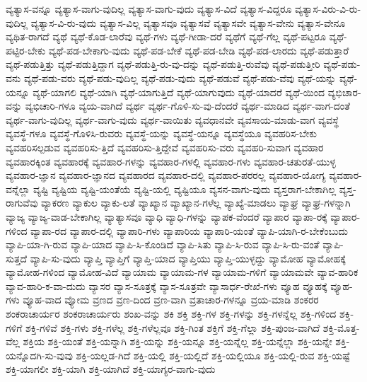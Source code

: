 {ವ್ಯತ್ಯಾಸ-ವನ್ನೂ
ವ್ಯತ್ಯಾಸ-ವಾಗು-ವುದಿಲ್ಲ
ವ್ಯತ್ಯಾಸ-ವಾಗು-ವುದು
ವ್ಯತ್ಯಾಸ-ವಿದೆ
ವ್ಯತ್ಯಾಸ-ವಿದ್ದರೂ
ವ್ಯತ್ಯಾಸ-ವಿರು-ವಿ-ರು-ವುದಿಲ್ಲ
ವ್ಯತ್ಯಾಸ-ವಿ-ರು-ವುದು
ವ್ಯತ್ಯಾಸ-ವಿಲ್ಲ
ವ್ಯತ್ಯಾಸವೂ
ವ್ಯತ್ಯಾಸವೆ
ವ್ಯತ್ಯಾಸವೇ
ವ್ಯತ್ಯಾಸ-ವೇನು
ವ್ಯತ್ಯಾಸ-ವೇನೂ
ವ್ಯಥಿತ-ರಾಗದೆ
ವ್ಯಥೆ
ವ್ಯಥೆ-ಕೊಡ-ಲಾರೆವು
ವ್ಯಥೆ-ಗಳು
ವ್ಯಥೆ-ಗೀಡಾ-ದರೆ
ವ್ಯಥೆಗೆ
ವ್ಯಥೆ-ಗೆಲ್ಲ
ವ್ಯಥೆ-ಪಟ್ಟರೂ
ವ್ಯಥೆ-ಪಟ್ಟಿರ-ಬೇಕು
ವ್ಯಥೆ-ಪಡ-ಬೇಕಾಗು-ವುದು
ವ್ಯಥೆ-ಪಡ-ಬೇಕೆ
ವ್ಯಥೆ-ಪಡ-ಬೇಡಿ
ವ್ಯಥೆ-ಪಡ-ಲಾರದು
ವ್ಯಥೆ-ಪಡುತ್ತಾರೆ
ವ್ಯಥೆ-ಪಡುತ್ತಿತ್ತು
ವ್ಯಥೆ-ಪಡುತ್ತಿದ್ದಾಗ
ವ್ಯಥೆ-ಪಡುತ್ತಿ-ರು-ವು-ದನ್ನು
ವ್ಯಥೆ-ಪಡುತ್ತಿ-ರುವೆವು
ವ್ಯಥೆ-ಪಡುತ್ತೀರಿ
ವ್ಯಥೆ-ಪಡು-ವನು
ವ್ಯಥೆ-ಪಡು-ವರು
ವ್ಯಥೆ-ಪಡು-ವುದಿಲ್ಲ
ವ್ಯಥೆ-ಪಡು-ವುದು
ವ್ಯಥೆ-ಪಡುವೆ
ವ್ಯಥೆ-ಪಡು-ವೆವು
ವ್ಯಥೆ-ಯನ್ನು
ವ್ಯಥೆ-ಯನ್ನೂ
ವ್ಯಥೆ-ಯಾಗಲಿ
ವ್ಯಥೆ-ಯಾಗಿ
ವ್ಯಥೆ-ಯಾಗುತ್ತಿದೆ
ವ್ಯಥೆ-ಯಾಗುವುದು
ವ್ಯಥೆ-ಯಾದರೆ
ವ್ಯಥೆ-ಯಿಂದ
ವ್ಯಭಿಚಾರ-ವನ್ನು
ವ್ಯಭಿಚಾರಿ-ಗಳೂ
ವ್ಯಯ-ವಾಗಿದೆ
ವ್ಯರ್ಥ
ವ್ಯರ್ಥ-ಗೊಳಿ-ಸು-ವು-ದೆಂದರೆ
ವ್ಯರ್ಥ-ಮಾಡಿದ
ವ್ಯರ್ಥ-ವಾಗ-ದಂತೆ
ವ್ಯರ್ಥ-ವಾಗು-ವುದಿಲ್ಲ
ವ್ಯರ್ಥ-ವಾಗು-ವುದು
ವ್ಯರ್ಥ-ವಾಯಿತು
ವ್ಯವಧಾನವೇ
ವ್ಯವಸಾಯ-ಮಾಡು-ವಾಗ
ವ್ಯವಸ್ಥೆ
ವ್ಯವಸ್ಥೆ-ಗಳೂ
ವ್ಯವಸ್ಥೆ-ಗೊಳಿಸಿ-ರುವರು
ವ್ಯವಸ್ಥೆ-ಯನ್ನು
ವ್ಯವಸ್ಥೆ-ಯನ್ನೂ
ವ್ಯವಸ್ಥೆಯೂ
ವ್ಯವಹರಿಸ-ಬೇಕು
ವ್ಯವಹರಿಸಲ್ಪಡುವ
ವ್ಯವಹರಿಸು-ತ್ತಿದೆ
ವ್ಯವಹರಿಸು-ತ್ತಿದ್ದೇವೆ
ವ್ಯವಹರಿಸು-ವರು
ವ್ಯವಹರಿ-ಸುವಾಗ
ವ್ಯವಹಾರ
ವ್ಯವಹಾರಕ್ಕಿಂತ
ವ್ಯವಹಾರಕ್ಕೆ
ವ್ಯವಹಾರ-ಗಳನ್ನು
ವ್ಯವಹಾರ-ಗಳಲ್ಲಿ
ವ್ಯವಹಾರ-ಗಳು
ವ್ಯವಹಾರ-ಚತುರತೆ-ಯುಳ್ಳ
ವ್ಯವಹಾರ-ಜ್ಞಾನ
ವ್ಯವಹಾರ-ಜ್ಞಾನದ
ವ್ಯವಹಾರದ
ವ್ಯವಹಾರ-ದಲ್ಲಿ
ವ್ಯವಹಾರ-ಪರರಲ್ಲ
ವ್ಯವಹಾರ-ಯೋಗ್ಯ
ವ್ಯವಹಾರ-ವನ್ನೆಲ್ಲಾ
ವ್ಯಷ್ಟಿ
ವ್ಯಷ್ಟಿಯ
ವ್ಯಷ್ಟಿ-ಯಂತೆಯೆ
ವ್ಯಷ್ಟಿ-ಯಲ್ಲಿ
ವ್ಯಷ್ಟಿಯೂ
ವ್ಯಸನ-ವಾಗು-ವುದು
ವ್ಯಸ್ತರಾಗ-ಬೇಕಾಗಿಲ್ಲ
ವ್ಯಸ್ತ-ರಾಗುವೆವು
ವ್ಯಾಕರಣ
ವ್ಯಾಕುಲ
ವ್ಯಾಕು-ಲತೆ
ವ್ಯಾಖ್ಯಾನ
ವ್ಯಾಖ್ಯಾನ-ಗಳೆಲ್ಲ
ವ್ಯಾಖ್ಯೆ-ಮಾಡಲು
ವ್ಯಾಘ್ರ
ವ್ಯಾಘ್ರ-ಗಳನ್ನಾಗಿ
ವ್ಯಾಜ್ಯ
ವ್ಯಾಜ್ಯ-ವಾಡ-ಬೇಕಾಗಿಲ್ಲ
ವ್ಯಾತ್ಯಾಸವೂ
ವ್ಯಾಧಿ
ವ್ಯಾಧಿ-ಗಳನ್ನು
ವ್ಯಾಪಕ-ವೆಂದರೆ
ವ್ಯಾಪಾರ
ವ್ಯಾಪಾ-ರಕ್ಕೆ
ವ್ಯಾಪಾರ-ಗಳಿಂದ
ವ್ಯಾಪಾ-ರದ
ವ್ಯಾಪಾರ-ದಲ್ಲಿ
ವ್ಯಾಪಾರಿ-ಗಳು
ವ್ಯಾಪಾರಿಯ
ವ್ಯಾಪಾರಿ-ಯಂತೆ
ವ್ಯಾಪಿ-ಯಾಗಿ-ರ-ಬೇಕೆಂಬುದು
ವ್ಯಾಪಿ-ಯಾ-ಗಿ-ರುವ
ವ್ಯಾಪಿ-ಯಾದ
ವ್ಯಾಪಿ-ಸಿ-ಕೊಂಡಿದೆ
ವ್ಯಾಪಿ-ಸಿತು
ವ್ಯಾಪಿ-ಸಿ-ರುವ
ವ್ಯಾಪಿ-ಸಿ-ರು-ವಂತೆ
ವ್ಯಾಪಿ-ಸುತ್ತದೆ
ವ್ಯಾಪಿ-ಸು-ವುದು
ವ್ಯಾಪ್ತಿ
ವ್ಯಾಪ್ತಿಗೆ
ವ್ಯಾಪ್ತಿ-ಯಾದ
ವ್ಯಾಪ್ತಿಯು
ವ್ಯಾಪ್ತಿ-ಯುಳ್ಳದ್ದು
ವ್ಯಾಮೋಹ
ವ್ಯಾಮೋಹಕ್ಕೆ
ವ್ಯಾಮೋಹ-ಗಳಿಂದ
ವ್ಯಾಮೋಹ-ವಿದೆ
ವ್ಯಾಯಾಮ
ವ್ಯಾಯಾಮ-ಗಳ
ವ್ಯಾಯಾಮ-ಗಳಿಗೆ
ವ್ಯಾಯಾಮವೇ
ವ್ಯಾವ-ಹಾರಿಕ
ವ್ಯಾವ-ಹಾರಿ-ಕ-ವಾ-ದುದು
ವ್ಯಾಸರ
ವ್ಯಾಸ-ಸೂತ್ರಕ್ಕೆ
ವ್ಯಾಸ-ಸೂತ್ರವೇ
ವ್ಯಾಸಾರ್ಧ-ರೇಖೆ-ಗಳು
ವ್ಯೂಹ
ವ್ಯೂಹಕ್ಕೆ
ವ್ಯೂಹ-ಗಳು
ವ್ಯೂಹ-ವಾದ
ವ್ಯೋಮ
ವ್ರಣದ
ವ್ರಣ-ದಿಂದ
ವ್ರಣ-ವಾಗಿ
ವ್ರತಾಚಾರ-ಗಳನ್ನೂ
ವ್ರಯ-ಮಾಡಿ
ಶಂಕರರ
ಶಂಕರಾಚಾರ್ಯರ
ಶಂಕರಾಚಾರ್ಯರು
ಶಂಖ-ವನ್ನು
ಶಕಿ
ಶಕ್ತಿ
ಶಕ್ತಿ-ಗಳ
ಶಕ್ತಿ-ಗಳನ್ನು
ಶಕ್ತಿ-ಗಳನ್ನೆಲ್ಲ
ಶಕ್ತಿ-ಗಳಿಂದ
ಶಕ್ತಿ-ಗಳಿಗೆ
ಶಕ್ತಿ-ಗಳಿವೆ
ಶಕ್ತಿ-ಗಳು
ಶಕ್ತಿ-ಗಳೆಲ್ಲ
ಶಕ್ತಿ-ಗಳೆಲ್ಲವೂ
ಶಕ್ತಿ-ಗಿಂತ
ಶಕ್ತಿಗೆ
ಶಕ್ತಿ-ಗೆಲ್ಲಾ
ಶಕ್ತಿ-ಪುಂಜ-ವಾಗಿದೆ
ಶಕ್ತಿ-ಮೊತ್ತ-ವೆಲ್ಲ
ಶಕ್ತಿಯ
ಶಕ್ತಿ-ಯಂತೆ
ಶಕ್ತಿ-ಯನ್ನಾಗಿ
ಶಕ್ತಿ-ಯನ್ನು
ಶಕ್ತಿ-ಯನ್ನೂ
ಶಕ್ತಿ-ಯನ್ನೆಲ್ಲ
ಶಕ್ತಿ-ಯನ್ನೆಲ್ಲಾ
ಶಕ್ತಿ-ಯನ್ನೇ
ಶಕ್ತಿ-ಯನ್ನೊದಗಿ-ಸು-ವುವು
ಶಕ್ತಿ-ಯಲ್ಲಡ-ಗಿದೆ
ಶಕ್ತಿ-ಯಲ್ಲಿ
ಶಕ್ತಿ-ಯಲ್ಲಿದೆ
ಶಕ್ತಿ-ಯಲ್ಲಿಯೂ
ಶಕ್ತಿ-ಯಲ್ಲಿ-ರುವ
ಶಕ್ತಿ-ಯಷ್ಟೆ
ಶಕ್ತಿ-ಯಾಗಲೀ
ಶಕ್ತಿ-ಯಾಗಿ
ಶಕ್ತಿ-ಯಾಗಿದೆ
ಶಕ್ತಿ-ಯಾಗ್ಯರ-ವಾಗು-ವುದು
}
